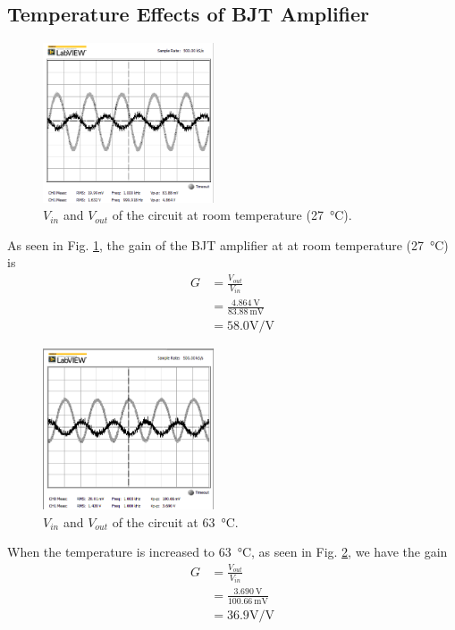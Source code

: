 \documentclass[journal]{IEEEtran}
\begin{document}
\subsection{Temperature Effects of BJT Amplifier}
\begin{figure}[H]
  \centering
  \includegraphics[width=0.45\textwidth]{images/27degree.png}
  \caption{$V_{in}$ and $V_{out}$ of the circuit at room temperature (\SI{27}{\celsius}).}
  \label{fig-3-1}
\end{figure}
As seen in Fig. \ref{fig-3-1}, the gain of the BJT amplifier at at room temperature (\SI{27}{\celsius}) is
\begin{equation*}
  \begin{split}
    G&=\frac{V_{out}}{V_{in}}\\
    &=\frac{\SI{4.864}{\volt}}{\SI{83.88}{\milli\volt}}\\
    &=58.0 \si{\volt}/\si{\volt}
  \end{split}
\end{equation*}
\begin{figure}[h]
  \centering
  \includegraphics[width=0.45\textwidth]{images/63degree.png}
  \caption{$V_{in}$ and $V_{out}$ of the circuit at \SI{63}{\celsius}.}
  \label{fig-3-2}
\end{figure}
When the temperature is increased to \SI{63}{\celsius}, as seen in Fig. \ref{fig-3-2}, we have the gain
\begin{equation*}
  \begin{split}
    G&=\frac{V_{out}}{V_{in}}\\
    &=\frac{\SI{3.690}{\volt}}{\SI{100.66}{\milli\volt}}\\
    &=36.9 \si{\volt}/\si{\volt}
  \end{split}
\end{equation*}
\end{document}
